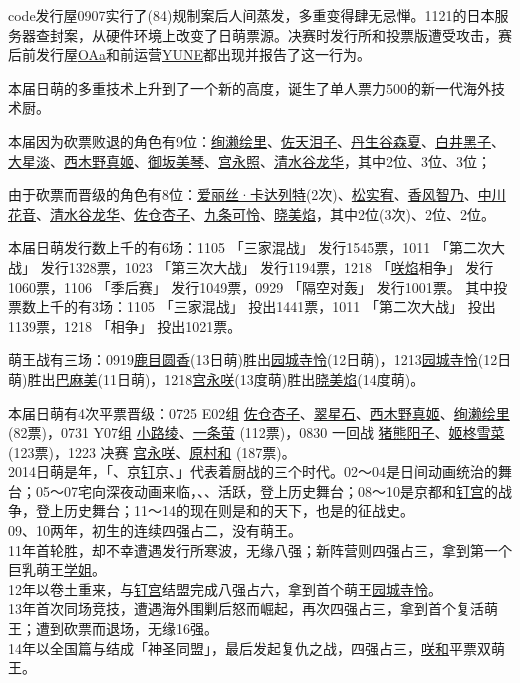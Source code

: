 code发行屋0907实行了(84)规制案后人间蒸发，多重变得肆无忌惮。1121的日本服务器查封案，从硬件环境上改变了日萌票源。决赛时发行所和投票版遭受攻击，赛后前发行屋\uline{OAa}和前运营\uline{YUNE}都出现并报告了这一行为。

本届日萌的多重技术上升到了一个新的高度，诞生了单人票力500的新一代海外技术厨。

本届因为砍票败退的角色有9位：\uline{绚濑绘里}、\uline{佐天泪子}、\uline{丹生谷森夏}、\uline{白井黑子}、\uline{大星淡}、\uline{西木野真姬}、\uline{御坂美琴}、\uline{宫永照}、\uline{清水谷龙华}，其中2位、3位、3位；

由于砍票而晋级的角色有8位：\uline{爱丽丝·卡达列特}(2次)、\uline{松实宥}、\uline{香风智乃}、\uline{中川花音}、\uline{清水谷龙华}、\uline{佐仓杏子}、\uline{九条可怜}、\uline{晓美焰}，其中2位(3次)、2位、2位。

本届日萌发行数上千的有6场：1105 「三家混战」 发行1545票，1011 「第二次大战」 发行1328票，1023 「第三次大战」 发行1194票，1218 「\uline{咲焰}相争」 发行1060票，1106 「季后赛」 发行1049票，0929 「隔空对轰」 发行1001票。
其中投票数上千的有3场：1105 「三家混战」 投出1441票，1011 「第二次大战」 投出1139票，1218 「相争」 投出1021票。

萌王战有三场：0919\uline{鹿目圆香}(13日萌)胜出\uline{园城寺怜}(12日萌)，1213\uline{园城寺怜}(12日萌)胜出\uline{巴麻美}(11日萌)，1218\uline{宫永咲}(13度萌)胜出\uline{晓美焰}(14度萌)。

本届日萌有4次平票晋级：0725 E02组 \uline{佐仓杏子}、\uline{翠星石}、\uline{西木野真姬}、\uline{绚濑绘里} (82票)，0731 Y07组 \uline{小路绫}、\uline{一条萤} (112票)，0830 一回战 \uline{猪熊阳子}、\uline{姬柊雪菜} (123票)，1223 决赛 \uline{宫永咲}、\uline{原村和} (187票)。
\\

2014日萌是年，「、京\uline{钉}京、」代表着厨战的三个时代。02～04是日间动画统治的舞台；05～07宅向深夜动画来临，、、活跃，登上历史舞台；08～10是京都和\uline{钉宫}的战争，登上历史舞台；11～14的现在则是和的天下，也是的征战史。\\
09、10两年，初生的连续四强占二，没有萌王。\\
11年首轮胜，却不幸遭遇发行所寒波，无缘八强；新阵营则四强占三，拿到第一个巨乳萌王\uline{学姐}。\\
12年以卷土重来，与\uline{钉宫}结盟完成八强占六，拿到首个萌王\uline{园城寺怜}。\\
13年首次同场竞技，遭遇海外围剿后怒而崛起，再次四强占三，拿到首个复活萌王；遭到砍票而退场，无缘16强。\\
14年以全国篇与结成「神圣同盟」，最后发起复仇之战，四强占三，\uline{咲}\uline{和}平票双萌王。

